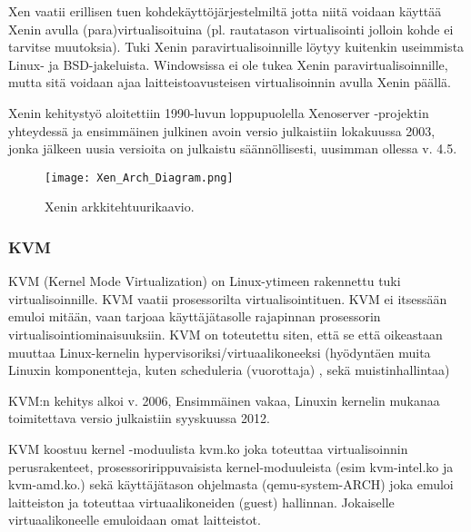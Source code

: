 Xen vaatii erillisen tuen kohdekäyttöjärjestelmiltä jotta niitä voidaan käyttää Xenin avulla (para)virtualisoituina (pl. rautatason virtualisointi jolloin kohde ei tarvitse muutoksia). Tuki Xenin paravirtualisoinnille löytyy kuitenkin useimmista Linux- ja BSD-jakeluista. Windowsissa ei ole tukea Xenin paravirtualisoinnille, mutta sitä voidaan ajaa laitteistoavusteisen virtualisoinnin avulla Xenin päällä.

Xenin kehitystyö aloitettiin 1990-luvun loppupuolella Xenoserver -projektin yhteydessä ja ensimmäinen julkinen avoin versio julkaistiin lokakuussa 2003, jonka jälkeen uusia versioita on julkaistu säännöllisesti, uusimman ollessa v. 4.5.


\begin{figure}[H]
\centering
\texttt{[image: Xen\_Arch\_Diagram.png]}
\caption{Xenin arkkitehtuurikaavio.}
\end{figure}


\subsubsection{KVM}
KVM (Kernel Mode Virtualization) on Linux-ytimeen rakennettu tuki virtualisoinnille. KVM vaatii prosessorilta virtualisointituen. KVM ei itsessään emuloi mitään, vaan tarjoaa käyttäjätasolle rajapinnan prosessorin virtualisointiominaisuuksiin. KVM on toteutettu siten, että se että oikeastaan muuttaa Linux-kernelin hypervisoriksi/virtuaalikoneeksi  (hyödyntäen muita Linuxin komponentteja, kuten scheduleria (vuorottaja) , sekä muistinhallintaa)

KVM:n kehitys alkoi v. 2006, Ensimmäinen vakaa, Linuxin kernelin mukanaa toimitettava versio julkaistiin syyskuussa 2012.

KVM koostuu kernel -moduulista kvm.ko joka toteuttaa virtualisoinnin perusrakenteet, prosessoririppuvaisista kernel-moduuleista (esim kvm-intel.ko ja kvm-amd.ko.) sekä käyttäjätason ohjelmasta (qemu-system-ARCH) joka emuloi laitteiston ja toteuttaa virtuaalikoneiden (guest) hallinnan. Jokaiselle virtuaalikoneelle emuloidaan omat laitteistot.

